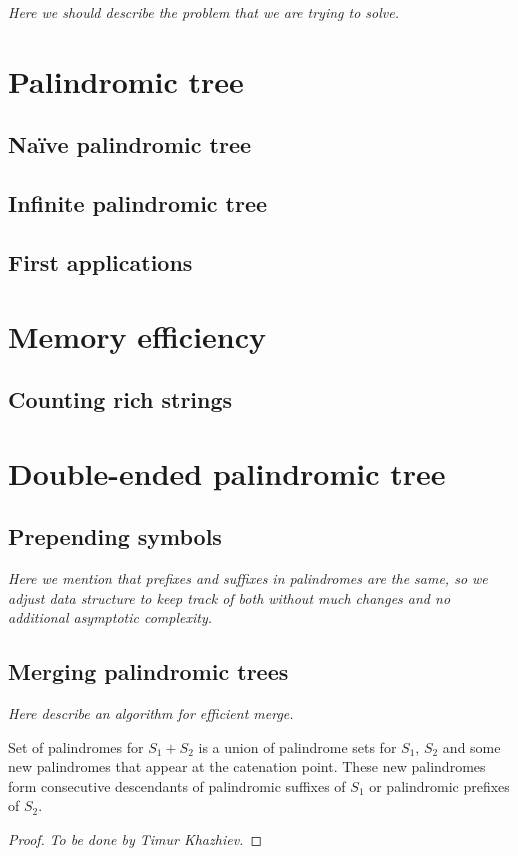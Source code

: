 \emph{Here we should describe the problem that we are trying to solve.}

\section{Palindromic tree}

\subsection{Naïve palindromic tree}

\subsection{Infinite palindromic tree}

\subsection{First applications}

\section{Memory efficiency}

\subsection{Counting rich strings}

\section{Double-ended palindromic tree}

\subsection{Prepending symbols}

\emph{Here we mention that prefixes and suffixes
in palindromes are the same, so we adjust data structure
to keep track of both without much changes and no
additional asymptotic complexity.}

\subsection{Merging palindromic trees}

\emph{Here describe an algorithm for efficient merge.}

\begin{lemma}
Set of palindromes for $S_1 + S_2$ is a union of
palindrome sets for $S_1$, $S_2$ and some new palindromes
that appear at the catenation point. These new palindromes
form consecutive descendants of palindromic suffixes of $S_1$
or palindromic prefixes of $S_2$.
\end{lemma}
\begin{proof}
  \emph{To be done by Timur Khazhiev.}
\end{proof}

